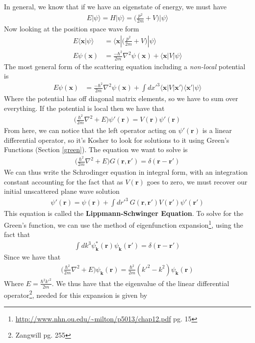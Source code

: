 In general, we know that if we have an eigenstate of energy, we must have
\begin{align}
    E|\psi\rangle = H|\psi\rangle = \Big(\frac{p^2}{2m} + V\Big)|\psi\rangle
\end{align}
Now looking at the position space wave form
\begin{align}
    E\langle \textbf{x} |\psi\rangle &=  \langle \textbf{x}|\Big(\frac{p^2}{2m} + V\Big)|\psi\rangle\\
    E\psi(\textbf{x}) &= \frac{-\hbar^2}{2m}\nabla^2\psi(\textbf{x}) + \langle\textbf{x}|V|\psi\rangle
\end{align}
The most general form of the scattering equation including a \emph{non-local} potential is
\begin{align}
    E\psi(\textbf{x}) &= \frac{-\hbar^2}{2m}\nabla^2\psi(\textbf{x}) + \int dx'^3\langle\textbf{x}|V|\textbf{x}'\rangle\langle\textbf{x}'|\psi\rangle
\end{align}
Where the potential has off diagonal matrix elements, so we have to sum over everything. If the potential is local then we have that
\begin{align}
\Big(\frac{\hbar^2}{2m}\nabla^2 + E\Big)\psi'(\textbf{r}) = V(\textbf{r})\psi'(\textbf{r})
\end{align}
From here, we can notice that the left operator acting on $\psi'(\textbf{r})$ is a linear differential operator, so it's Kosher to look for solutions to it using Green's Functions (Section \ref{green}). The equation we want to solve is
\begin{align}
\Big(\frac{\hbar^2}{2m}\nabla^2 + E\Big) G(\textbf{r}, \textbf{r}') = \delta(\textbf{r}-\textbf{r}')
\end{align}
We can thus write the Schrodinger equation in integral form, with an integration constant accounting for the fact that as $V(\textbf{r})$ goes to zero, we must recover our initial unscattered plane wave solution
\begin{align}\label{lippmann}
\psi'(\textbf{r}) = \psi(\textbf{r}) + \int dr'^3~G(\textbf{r}, \textbf{r}') V(\textbf{r}')\psi'(\textbf{r}')
\end{align}
This equation is called the \textbf{Lippmann-Schwinger Equation}. To solve for the Green's function, we can use the method of eigenfunction expansion\footnote{\url{http://www.nhn.ou.edu/~milton/p5013/chap12.pdf} pg. 15}, using the fact that
\begin{align}
\int dk^3 \psi_\textbf{k}^*(\textbf{r})\psi_\textbf{k}(\textbf{r}') = \delta(\textbf{r}-\textbf{r}')
\end{align}
Since we have that
\begin{align}
\Big(\frac{\hbar^2}{2m}\nabla^2 + E\Big)\psi_\textbf{k}(\textbf{r}) = \frac{\hbar^2}{2m}(k'^2 - k^2)\psi_\textbf{k}(\textbf{r})
\end{align}
Where $E = \frac{\hbar^2k'^2}{2m}$. We thus have that the eigenvalue of the linear differential operator\footnote{Zangwill pg. 255}, needed for this expansion is given by

